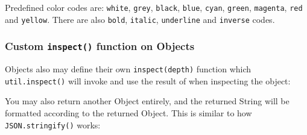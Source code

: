 Predefined color codes are: \texttt{white}, \texttt{grey},
\texttt{black}, \texttt{blue}, \texttt{cyan}, \texttt{green},
\texttt{magenta}, \texttt{red} and \texttt{yellow}. There are also
\texttt{bold}, \texttt{italic}, \texttt{underline} and \texttt{inverse}
codes.

\subsubsection{Custom \texttt{inspect()} function on Objects}

Objects also may define their own \texttt{inspect(depth)} function which
\texttt{util.inspect()} will invoke and use the result of when
inspecting the object:

\begin{Shaded}
\begin{Highlighting}[]
 \NormalTok{);}

 \NormalTok{: } \NormalTok{\};}
 \NormalTok{= }
    \NormalTok{+ } \NormalTok{+ }\NormalTok{;}
\NormalTok{\};}

\end{Highlighting}
\end{Shaded}

You may also return another Object entirely, and the returned String
will be formatted according to the returned Object. This is similar to
how \texttt{JSON.stringify()} works:

\begin{Shaded}
\begin{Highlighting}[]
 \NormalTok{: } \NormalTok{\};}
 \NormalTok{= }
   \NormalTok{\{ }\NormalTok{: } \NormalTok{\};}
\NormalTok{\};}

\end{Highlighting}
\end{Shaded}

